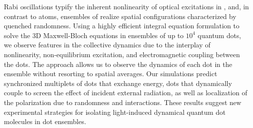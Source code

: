 Rabi oscillations typify the inherent nonlinearity of optical excitations in \qds{}, and, in contrast to atoms, ensembles of \qds{} realize spatial configurations characterized by quenched randomness.
Using a highly efficient integral equation formulation to solve the 3D Maxwell-Bloch equations in ensembles of up to $10^4$ quantum dots, we observe features in the collective dynamics due to the interplay of nonlinearity, non-equilibrium excitation, and electromagnetic coupling between the dots.
The approach allows us to observe the dynamics of each dot in the ensemble without resorting to spatial averages.
Our simulations predict synchronized multiplets of dots that exchange energy, dots that dynamically couple to screen the effect of incident external radiation, as well as localization of the polarization due to randomness and interactions. These results suggest new experimental strategies for isolating light-induced  dynamical quantum dot molecules in dot ensembles.
